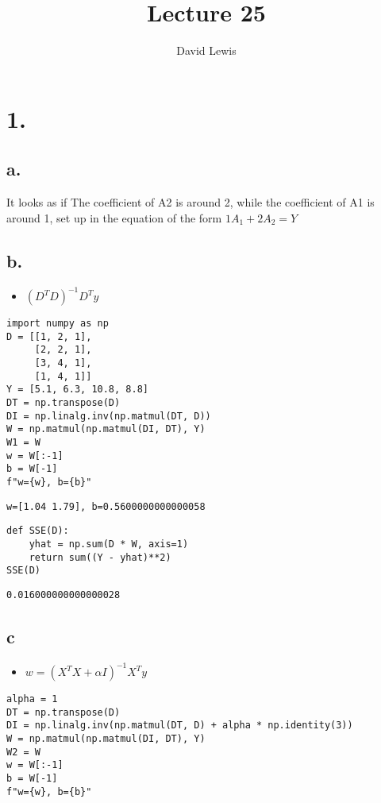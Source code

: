 \documentclass[11pt]{article}
\author{David Lewis}
\date{}
\title{Lecture 25}
\begin{document}
\maketitle

\section*{1.}
\label{sec:org2a7b3b0}
\subsection*{a.}
\label{sec:org9487f7f}
It looks as if The coefficient of A2 is around 2, while the coefficient of A1 is
around 1, set up in the equation of the form \(1A_1 + 2A_2 = Y\)
\subsection*{b.}
\label{sec:org7913dc7}
\begin{itemize}
\item \((D^TD)^{-1}D^Ty\)
\end{itemize}
\begin{verbatim}
import numpy as np
D = [[1, 2, 1],
     [2, 2, 1],
     [3, 4, 1],
     [1, 4, 1]]
Y = [5.1, 6.3, 10.8, 8.8]
DT = np.transpose(D)
DI = np.linalg.inv(np.matmul(DT, D))
W = np.matmul(np.matmul(DI, DT), Y)
W1 = W
w = W[:-1]
b = W[-1]
f"w={w}, b={b}"
\end{verbatim}

\begin{verbatim}
w=[1.04 1.79], b=0.5600000000000058
\end{verbatim}


\begin{verbatim}
def SSE(D):
    yhat = np.sum(D * W, axis=1)
    return sum((Y - yhat)**2)
SSE(D)
\end{verbatim}

\begin{verbatim}
0.016000000000000028
\end{verbatim}

\subsection*{c}
\label{sec:orgf089031}
\begin{itemize}
\item \(w = (X^TX + \alpha I)^{-1}X^Ty\)
\end{itemize}
\begin{verbatim}
alpha = 1
DT = np.transpose(D)
DI = np.linalg.inv(np.matmul(DT, D) + alpha * np.identity(3))
W = np.matmul(np.matmul(DI, DT), Y)
W2 = W
w = W[:-1]
b = W[-1]
f"w={w}, b={b}"
\end{verbatim}
\end{document}
